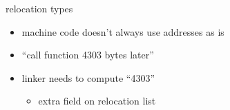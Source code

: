 \begin{frame}{relocation types}
    \begin{itemize}
    \item machine code doesn't always use addresses as is
    \item ``call function 4303 bytes later''
    \item linker needs to compute ``4303''
        \begin{itemize}
        \item extra field on relocation list
        \end{itemize}
    \end{itemize}
\end{frame}
